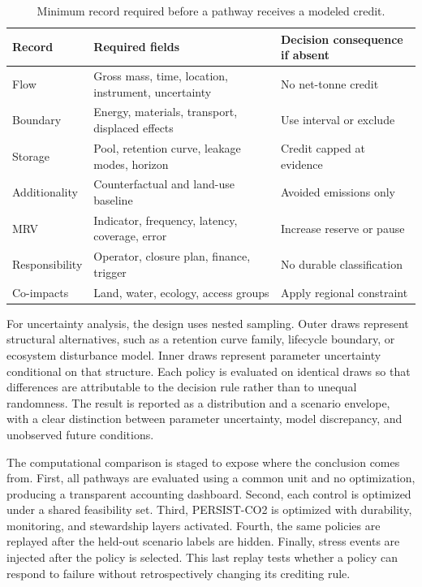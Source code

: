 \documentclass[conference]{IEEEtran}
\begin{document}
\begin{table}[t]
\centering
\caption{Minimum record required before a pathway receives a modeled credit.}
\label{tab:datacontract}
\footnotesize
\begin{tabular}{P{1.85cm}P{2.35cm}P{2.0cm}}
\toprule
Record & Required fields & Decision consequence if absent \\
\midrule
Flow & Gross mass, time, location, instrument, uncertainty & No net-tonne credit \\
Boundary & Energy, materials, transport, displaced effects & Use interval or exclude \\
Storage & Pool, retention curve, leakage modes, horizon & Credit capped at evidence \\
Additionality & Counterfactual and land-use baseline & Avoided emissions only \\
MRV & Indicator, frequency, latency, coverage, error & Increase reserve or pause \\
Responsibility & Operator, closure plan, finance, trigger & No durable classification \\
Co-impacts & Land, water, ecology, access groups & Apply regional constraint \\
\bottomrule
\end{tabular}
\end{table}

For uncertainty analysis, the design uses nested sampling. Outer draws represent structural alternatives, such as a retention curve family, lifecycle boundary, or ecosystem disturbance model. Inner draws represent parameter uncertainty conditional on that structure. Each policy is evaluated on identical draws so that differences are attributable to the decision rule rather than to unequal randomness. The result is reported as a distribution and a scenario envelope, with a clear distinction between parameter uncertainty, model discrepancy, and unobserved future conditions.

The computational comparison is staged to expose where the conclusion comes from. First, all pathways are evaluated using a common unit and no optimization, producing a transparent accounting dashboard. Second, each control is optimized under a shared feasibility set. Third, PERSIST-CO2 is optimized with durability, monitoring, and stewardship layers activated. Fourth, the same policies are replayed after the held-out scenario labels are hidden. Finally, stress events are injected after the policy is selected. This last replay tests whether a policy can respond to failure without retrospectively changing its crediting rule.
\end{document}
